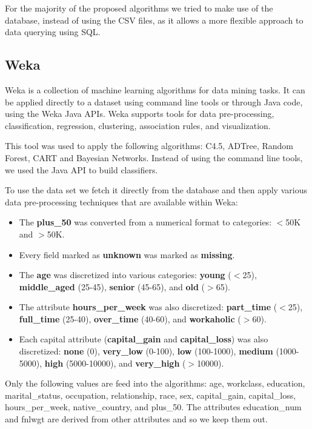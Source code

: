 \documentclass[a4paper]{llncs}
\begin{document}
For the majority of the proposed algorithms we tried to make use of the database, instead
of using the CSV files, as it allows a more flexible approach to data querying using SQL.

\subsection{Weka}
\label{sec:weka}

Weka is a collection of machine learning algorithms for data mining tasks. \cite{weka}
It can be applied directly to a dataset using command line tools or through Java code, using the Weka Java APIs.
Weka supports tools for data pre-processing, classification, regression, clustering, association rules,
and visualization.

This tool was used to apply the following algorithms: C4.5, ADTree, Random Forest, CART and Bayesian Networks.
Instead of using the command line tools, we used the Java API to build classifiers.

To use the data set we fetch it directly from the database and then apply various data pre-processing
techniques that are available within Weka:

\begin{itemize}
  \item The \textbf{plus\_50} was converted from a numerical format to categories: $<$50K and $>$50K.
  \item Every field marked as \textbf{unknown} was marked as \textbf{missing}.
  \item The \textbf{age} was discretized into various categories: \textbf{young} ($<$25),
    \textbf{middle\_aged} (25-45), \textbf{senior} (45-65), and \textbf{old} ($>$65).
  \item The attribute \textbf{hours\_per\_week} was also discretized: \textbf{part\_time} ($<$25),
    \textbf{full\_time} (25-40), \textbf{over\_time} (40-60), and \textbf{workaholic} ($>$60).
  \item Each capital attribute (\textbf{capital\_gain} and \textbf{capital\_loss}) was also discretized:
    \textbf{none} (0), \textbf{very\_low} (0-100), \textbf{low} (100-1000), \textbf{medium} (1000-5000),
    \textbf{high} (5000-10000), and \textbf{very\_high} ($>$10000).
\end{itemize}

Only the following values are feed into the algorithms: age, workclass, education,
marital\_status, occupation, relationship, race, sex, capital\_gain, capital\_loss,
hours\_per\_week, native\_country, and plus\_50. The attributes education\_num
and fnlwgt are derived from other attributes and so we keep them out.
\end{document}
